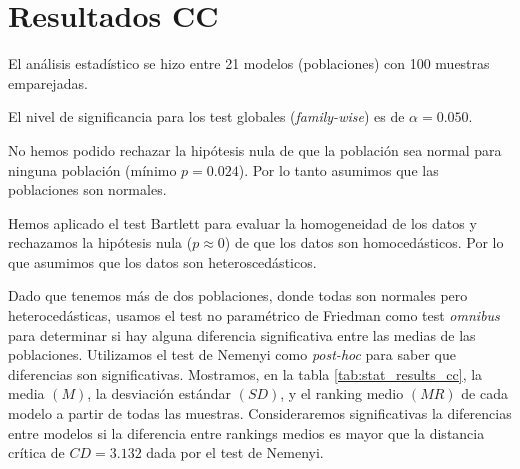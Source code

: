 \documentclass[a4paper,oneside,11pt,leqno]{article}
\begin{document}
	
	\section{Resultados CC}
	\label{sec:results_cc}
	
	El análisis estadístico se hizo entre 21 modelos (poblaciones) con 100 muestras emparejadas.
	
	El nivel de significancia para los test globales (\textit{family-wise}) es de $\alpha=0.050$.

	No hemos podido rechazar la hipótesis nula de que la población sea normal para ninguna población (mínimo $p=0.024$). Por lo tanto asumimos que las poblaciones son normales.
	
	Hemos aplicado el test Bartlett para evaluar la homogeneidad de los datos y rechazamos la hipótesis nula ($p\approx 0$) de que los datos son homocedásticos. Por lo que asumimos que los datos son heteroscedásticos.
	
	Dado que tenemos más de dos poblaciones, donde todas son normales pero heterocedásticas, usamos el test no paramétrico de Friedman como test \textit{omnibus} para determinar si hay alguna diferencia significativa entre las medias de las poblaciones. Utilizamos el test de Nemenyi como \textit{post-hoc} para saber que diferencias son significativas. Mostramos, en la tabla \ref{tab:stat_results_cc}, la media $(M)$, la desviación estándar $(SD)$, y el ranking medio $(MR)$ de cada modelo a partir de todas las muestras. Consideraremos significativas la diferencias entre modelos si la diferencia entre rankings medios es mayor que la distancia crítica de $CD=3.132$ dada por el test de Nemenyi.
	
\end{document}

